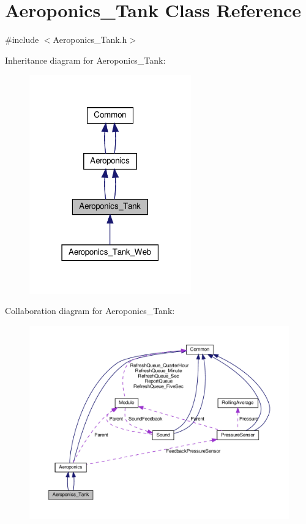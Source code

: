 \hypertarget{class_aeroponics___tank}{}\section{Aeroponics\+\_\+\+Tank Class Reference}
\label{class_aeroponics___tank}


{\ttfamily \#include $<$Aeroponics\+\_\+\+Tank.\+h$>$}



Inheritance diagram for Aeroponics\+\_\+\+Tank\+:
\nopagebreak
\begin{figure}[H]
\begin{center}
\leavevmode
\includegraphics[width=198pt]{class_aeroponics___tank__inherit__graph}
\end{center}
\end{figure}


Collaboration diagram for Aeroponics\+\_\+\+Tank\+:
\nopagebreak
\begin{figure}[H]
\begin{center}
\leavevmode
\includegraphics[width=350pt]{class_aeroponics___tank__coll__graph}
\end{center}
\end{figure}
